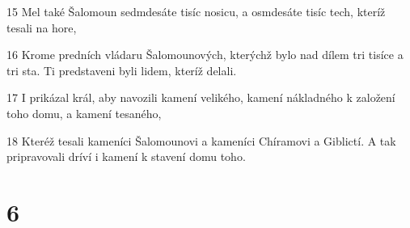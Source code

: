 \par 15 Mel také Šalomoun sedmdesáte tisíc nosicu, a osmdesáte tisíc tech, kteríž tesali na hore,
\par 16 Krome predních vládaru Šalomounových, kterýchž bylo nad dílem tri tisíce a tri sta. Ti predstaveni byli lidem, kteríž delali.
\par 17 I prikázal král, aby navozili kamení velikého, kamení nákladného k založení toho domu, a kamení tesaného,
\par 18 Kteréž tesali kameníci Šalomounovi a kameníci Chíramovi a Giblictí. A tak pripravovali dríví i kamení k stavení domu toho.

\chapter{6}

